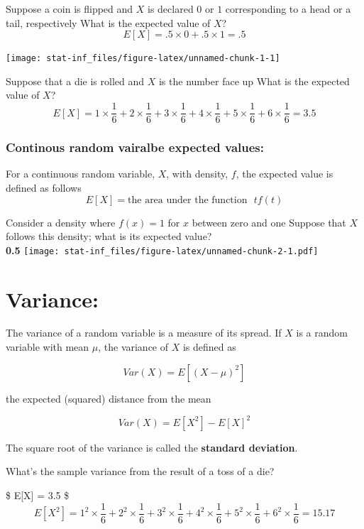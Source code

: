 \documentclass[]{article}
\begin{document}
Suppose a coin is flipped and \(X\) is declared \(0\) or \(1\)
corresponding to a head or a tail, respectively What is the expected
value of \(X\)? \[
E[X] = .5 \times 0 + .5 \times 1 = .5
\]

\begin{center}\texttt{[image: stat-inf\_files/figure-latex/unnamed-chunk-1-1]} \end{center}

Suppose that a die is rolled and \(X\) is the number face up What is the
expected value of \(X\)? \[
E[X] = 1 \times \frac{1}{6} + 2 \times \frac{1}{6} +
3 \times \frac{1}{6} + 4 \times \frac{1}{6} +
5 \times \frac{1}{6} + 6 \times \frac{1}{6} = 3.5
\]

\hypertarget{continous-random-vairalbe-expected-values}{%
\subsubsection{Continous random vairalbe expected
values:}\label{continous-random-vairalbe-expected-values}}

For a continuous random variable, \(X\), with density, \(f\), the
expected value is defined as follows \[
E[X] = \mbox{the area under the function}~~~ t f(t)
\]

Consider a density where \(f(x) = 1\) for \(x\) between zero and one
Suppose that \(X\) follows this density; what is its expected value?\\
\textbf{0.5}
\texttt{[image: stat-inf\_files/figure-latex/unnamed-chunk-2-1.pdf]}

\hypertarget{variance}{%
\section{Variance:}\label{variance}}

The variance of a random variable is a measure of its spread. If \(X\)
is a random variable with mean \(\mu\), the variance of \(X\) is defined
as

\[Var(X) = E[(X - \mu)^2]\]

the expected (squared) distance from the mean

\[Var(X) = E[X^2] - E[X]^2\]

The square root of the variance is called the \textbf{standard
deviation}.

What's the sample variance from the result of a toss of a die?

\$ E{[}X{]} = 3.5 \$ \[
E[X^2] = 1 ^ 2 \times \frac{1}{6} + 2 ^ 2 \times \frac{1}{6} + 3 ^ 2 \times \frac{1}{6} + 4 ^ 2 \times \frac{1}{6} + 5 ^ 2 \times \frac{1}{6} + 6 ^ 2 \times \frac{1}{6} = 15.17
\]
\end{document}

